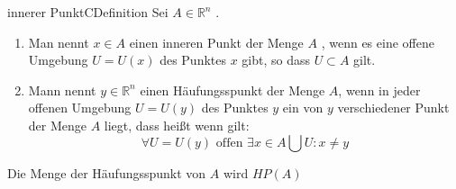 \documentclass[a4paper]{memoir}
\begin{document}
\begin{ibox}{innerer Punkt}{CDefinition}
   Sei $ A \in \mathbb{R}^n $ .
   \begin{enumerate}[label=\alph*)]
   	\item Man nennt $ x \in A $ einen inneren Punkt der Menge $ A $ , wenn es eine offene Umgebung $ U = U(x) $ des Punktes $ x $ gibt,
		so dass $ U \subset A $ gilt.
    \item Mann nennt $ y \in \mathbb{R}^n $ einen Häufungsspunkt der Menge $ A $, wenn in jeder offenen Umgebung $ U = U(y) $ des
		Punktes $ y $ ein von $ y $ verschiedener Punkt der Menge $ A $ liegt, dass heißt wenn gilt:
		$$ \forall U = U(y) \text{ offen } \exists x \in A \bigcup U : x \neq y $$
		
   \end{enumerate}
  Die Menge der Häufungsspunkt von $ A $ wird $ HP(A) $ 
\end{ibox}
\end{document}
